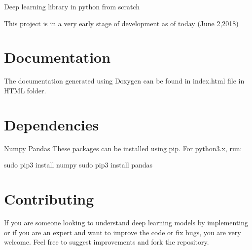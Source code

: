 Deep learning library in python from scratch

This project is in a very early stage of development as of today (June 2,2018)

\section*{Documentation}

The documentation generated using Doxygen can be found in index.\+html file in H\+T\+ML folder.

\section*{Dependencies}

Numpy Pandas These packages can be installed using pip. For python3.\+x, run\+: 
\begin{DoxyCode}
sudo pip3 install numpy
sudo pip3 install pandas
\end{DoxyCode}


\section*{Contributing}

If you are someone looking to understand deep learning models by implementing or if you are an expert and want to improve the code or fix bugs, you are very welcome. Feel free to suggest improvements and fork the repository. 